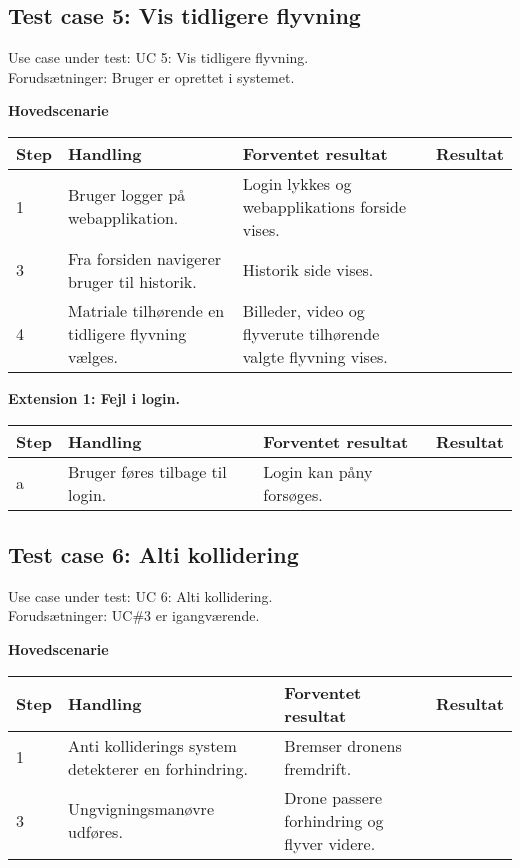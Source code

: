 \newpage
\subsection*{Test case 5: Vis tidligere flyvning}
Use case under test: UC 5: Vis tidligere flyvning.\\
Forudsætninger:	Bruger er oprettet i systemet.

\textbf{Hovedscenarie}
\begin{table}[H]
	\centering
		\begin{tabular}{|l|p{5 cm}|p{5 cm}|p{3.5 cm}|} 
		\hline
			Step & Handling & Forventet resultat & Resultat\\ \hline
			1 & Bruger logger på webapplikation. & Login lykkes og webapplikations forside vises. &  \\ \hline
			3 & Fra forsiden navigerer bruger til historik. & Historik side vises. & \\ \hline
			4 & Matriale tilhørende en tidligere flyvning vælges. & Billeder, video og flyverute tilhørende valgte flyvning vises. & \\ \hline			
		\end{tabular}
\end{table}

\textbf{Extension 1: Fejl i login.}
\begin{table}[H]
	\centering
		\begin{tabular}{|l|p{5 cm}|p{5 cm}|p{3.5 cm}|} 
		\hline
			Step & Handling & Forventet resultat & Resultat\\ \hline
			a & Bruger føres tilbage til login. & Login kan påny forsøges. & \\ \hline
		\end{tabular}
\end{table}

\subsection*{Test case 6: Alti kollidering}
Use case under test: UC 6: Alti kollidering.\\
Forudsætninger:	UC\#3 er igangværende.

\textbf{Hovedscenarie}
\begin{table}[H]
	\centering
		\begin{tabular}{|l|p{5 cm}|p{5 cm}|p{3.5 cm}|} 
		\hline
			Step & Handling & Forventet resultat & Resultat\\ \hline
			1 & Anti kolliderings system detekterer en forhindring. & Bremser dronens fremdrift. &  \\ \hline
			3 & Ungvigningsmanøvre udføres. & Drone passere forhindring og flyver videre. & \\ \hline			
		\end{tabular}
\end{table}

